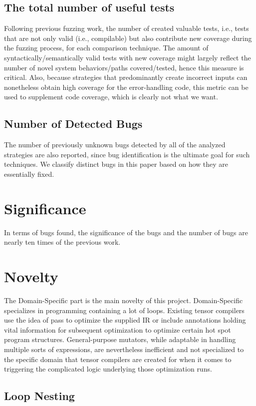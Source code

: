 \documentclass[conference]{IEEEtran}
\begin{document}
\subsection{The total number of useful tests} Following previous fuzzing work,  the number of created valuable tests, i.e., tests that are not only valid (i.e., compilable) but also contribute new coverage during the fuzzing process, for each comparison technique. The amount of syntactically/semantically valid tests with new coverage might largely reflect the number of novel system behaviors/paths covered/tested, hence this measure is critical. Also, because strategies that predominantly create incorrect inputs can nonetheless obtain high coverage for the error-handling code, this metric can be used to supplement code coverage, which is clearly not what we want.
\subsection{Number of Detected Bugs}  The number of previously unknown bugs detected by all of the analyzed strategies are also reported, since bug identification is the ultimate goal for such techniques. We classify distinct bugs in this paper based on how they are essentially fixed.
\section{Significance}
In terms of bugs found, the significance of the bugs and the number of bugs are nearly ten times of the previous work.

\section{Novelty}
The Domain-Specific part is the main novelty of this project. Domain-Specific specializes in programming containing a lot of loops. Existing tensor compilers use the idea of pass to optimize the supplied IR or include annotations holding vital information for subsequent optimization to optimize certain hot spot program structures. General-purpose mutators, while adaptable in handling multiple sorts of expressions, are nevertheless inefficient and not specialized to the specific domain that tensor compilers are created for when it comes to triggering the complicated logic underlying those optimization runs.
\subsection{Loop Nesting}
\end{document}
